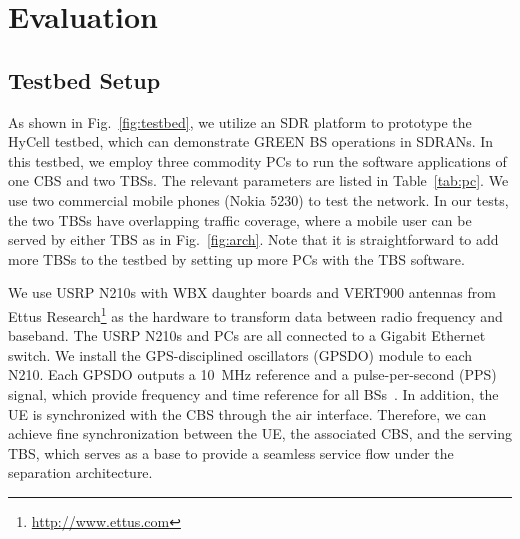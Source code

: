 \documentclass[conference]{IEEEtran}
\begin{document}
\section{Evaluation}
\label{sec:eval}
\subsection{Testbed Setup}
\label{sec:testbed}

As shown in Fig.~\ref{fig:testbed}, we utilize an SDR platform to prototype the
HyCell testbed, which can demonstrate GREEN BS operations in SDRANs.
In this testbed, we
employ three commodity PCs to run the software applications of one CBS and two TBSs.
The relevant parameters are listed in Table~\ref{tab:pc}.
We use two commercial mobile phones (Nokia 5230) to test the network.
In our tests, the two TBSs have overlapping traffic coverage, where a mobile user can
be served by either TBS as in Fig.~\ref{fig:arch}.
Note that it is straightforward to add more TBSs to the testbed by setting up
more PCs with the TBS software.

We use USRP N210s with WBX daughter boards and VERT900 antennas
from Ettus Research\footnote{\url{http://www.ettus.com}}
as the hardware to transform data
between radio frequency and baseband.
The USRP N210s and PCs are all connected to a Gigabit Ethernet switch.
We install the GPS-disciplined oscillators (GPSDO) module to each N210.
Each GPSDO outputs a \SI{10}{MHz} reference and a pulse-per-second (PPS)
signal, which provide frequency and time reference for all BSs~\cite{uhd2014synchronization}.
In addition, the UE is synchronized with the CBS through the air interface.
Therefore, we can achieve fine synchronization
between the UE, the associated CBS, and the serving TBS, which
serves as a base to provide a seamless service flow under the separation architecture.
\end{document}
